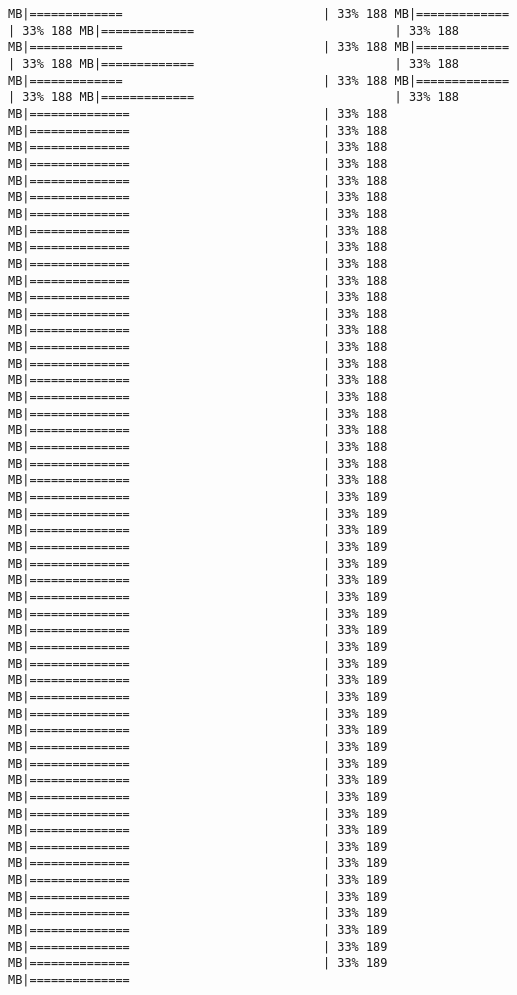 \documentclass[
]{article}
\begin{document}
\begin{verbatim}
MB|=============                            | 33% 188 MB|=============                            | 33% 188 MB|=============                            | 33% 188 MB|=============                            | 33% 188 MB|=============                            | 33% 188 MB|=============                            | 33% 188 MB|=============                            | 33% 188 MB|=============                            | 33% 188 MB|=============                            | 33% 188 MB|==============                           | 33% 188 MB|==============                           | 33% 188 MB|==============                           | 33% 188 MB|==============                           | 33% 188 MB|==============                           | 33% 188 MB|==============                           | 33% 188 MB|==============                           | 33% 188 MB|==============                           | 33% 188 MB|==============                           | 33% 188 MB|==============                           | 33% 188 MB|==============                           | 33% 188 MB|==============                           | 33% 188 MB|==============                           | 33% 188 MB|==============                           | 33% 188 MB|==============                           | 33% 188 MB|==============                           | 33% 188 MB|==============                           | 33% 188 MB|==============                           | 33% 188 MB|==============                           | 33% 188 MB|==============                           | 33% 188 MB|==============                           | 33% 188 MB|==============                           | 33% 188 MB|==============                           | 33% 188 MB|==============                           | 33% 189 MB|==============                           | 33% 189 MB|==============                           | 33% 189 MB|==============                           | 33% 189 MB|==============                           | 33% 189 MB|==============                           | 33% 189 MB|==============                           | 33% 189 MB|==============                           | 33% 189 MB|==============                           | 33% 189 MB|==============                           | 33% 189 MB|==============                           | 33% 189 MB|==============                           | 33% 189 MB|==============                           | 33% 189 MB|==============                           | 33% 189 MB|==============                           | 33% 189 MB|==============                           | 33% 189 MB|==============                           | 33% 189 MB|==============                           | 33% 189 MB|==============                           | 33% 189 MB|==============                           | 33% 189 MB|==============                           | 33% 189 MB|==============                           | 33% 189 MB|==============                           | 33% 189 MB|==============                           | 33% 189 MB|==============                           | 33% 189 MB|==============                           | 33% 189 MB|==============                           | 33% 189 MB|==============                           | 33% 189 MB|==============                           | 33% 189 MB|==============        
\end{verbatim}
\end{document}
